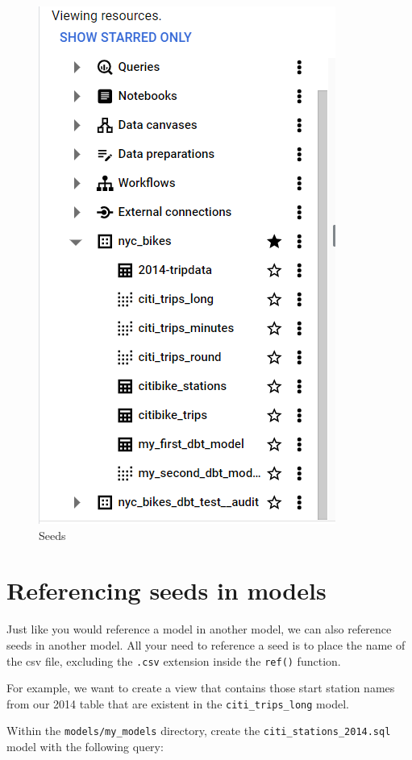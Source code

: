 \documentclass[
]{book}
\begin{document}
\begin{figure}
\centering
\includegraphics{./images/2014-tripdata.png}
\caption{Seeds}
\end{figure}

\hypertarget{referencing-seeds-in-models}{%
\section{Referencing seeds in models}\label{referencing-seeds-in-models}}

Just like you would reference a model in another model, we can also reference seeds in another model. All your need to reference a seed is to place the name of the csv file, excluding the \texttt{.csv} extension inside the \texttt{ref()} function.

For example, we want to create a view that contains those start station names from our 2014 table that are existent in the \texttt{citi\_trips\_long} model.

Within the \texttt{models/my\_models} directory, create the \texttt{citi\_stations\_2014.sql} model with the following query:
\end{document}
